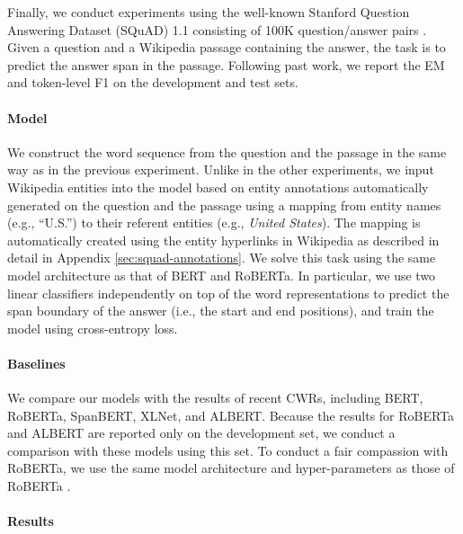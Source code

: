 \documentclass[11pt,a4paper]{article}
\begin{document}
Finally, we conduct experiments using the well-known Stanford Question Answering Dataset (SQuAD) 1.1 consisting of 100K question/answer pairs \cite{rajpurkar-etal-2016-squad}.
Given a question and a Wikipedia passage containing the answer, the task is to predict the answer span in the passage.
Following past work, we report the EM and token-level F1 on the development and test sets.

\paragraph{Model}

We construct the word sequence from the question and the passage in the same way as in the previous experiment.
Unlike in the other experiments, we input Wikipedia entities into the model based on entity annotations automatically generated on the question and the passage using a mapping from entity names (e.g., ``U.S.'') to their referent entities (e.g., \textit{United States}).
The mapping is automatically created using the entity hyperlinks in Wikipedia as described in detail in Appendix \ref{sec:squad-annotations}.
We solve this task using the same model architecture as that of BERT and RoBERTa.
In particular, we use two linear classifiers independently on top of the word representations to predict the span boundary of the answer (i.e., the start and end positions), and train the model using cross-entropy loss.

\paragraph{Baselines}

We compare our models with the results of recent CWRs, including BERT, RoBERTa, SpanBERT, XLNet, and ALBERT.
Because the results for RoBERTa and ALBERT are reported only on the development set, we conduct a comparison with these models using this set.
To conduct a fair compassion with RoBERTa, we use the same model architecture and hyper-parameters as those of RoBERTa \cite{Liu2020RoBERTa:Approach}.

\paragraph{Results}
\end{document}
